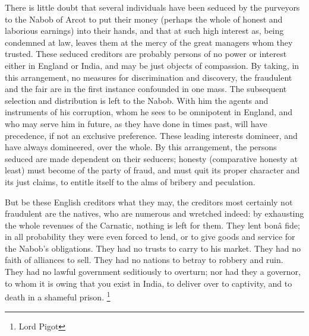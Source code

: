 There is little doubt that several individuals have been seduced by the purveyors to the Nabob of Arcot to put their money (perhaps the whole of honest and laborious earnings) into their hands, and that at such high interest as, being condemned at law, leaves them at the mercy of the great managers whom they trusted. These seduced creditors are probably persons of no power or interest either in England or India, and may be just objects of compassion. By taking, in this arrangement, no measures for discrimination and discovery, the fraudulent and the fair are in the first instance confounded in one mass. The subsequent selection and distribution is left to the Nabob. With him the agents and instruments of his corruption, whom he sees to be omnipotent in England, and who may serve him in future, as they have done in times past, will have precedence, if not an exclusive preference. These leading interests domineer, and have always domineered, over the whole. By this arrangement, the persons seduced are made dependent on their seducers; honesty (comparative honesty at least) must become of the party of fraud, and must quit its proper character and its just claims, to entitle itself to the alms of bribery and peculation.

But be these English creditors what they may, the creditors most certainly not fraudulent are the natives, who are numerous and wretched indeed: by exhausting the whole revenues of the Carnatic, nothing is left for them. They lent bonâ fide; in all probability they were even forced to lend, or to give goods and service for the Nabob's obligations. They had no trusts to carry to his market. They had no faith of alliances to sell. They had no nations to betray to robbery and ruin. They had no lawful government seditiously to overturn; nor had they a governor, to whom it is owing that you exist in India, to deliver over to captivity, and to death in a shameful prison.
\footnote{ Lord Pigot}


